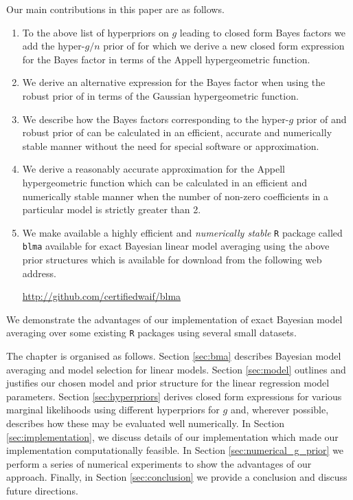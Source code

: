 Our main contributions in this paper are as follows.
\begin{enumerate}
	\item To the above list of hyperpriors on $g$ leading to closed form Bayes factors
	we add the  hyper-$g/n$ prior of \cite{Liang2008} for which we
	derive a new closed form expression for the Bayes factor in terms
	of the Appell hypergeometric function.
	
	\item We derive an alternative expression for the Bayes factor when using the
	robust prior of \cite{Bayarri2012} in terms of the Gaussian hypergeometric function.
	
	\item We describe how the  Bayes factors corresponding to the hyper-$g$ prior of \cite{Liang2008} 
	and robust prior of \cite{Bayarri2012} can be calculated in an efficient, accurate and numerically 
	stable manner without the need for special software or approximation.
	
	\item We derive a reasonably accurate approximation for the Appell hypergeometric function
	which can be calculated in an efficient and numerically 
	stable manner when the number of non-zero coefficients in a particular model is strictly greater than 2.
	
	\item We make available a highly efficient and {\it numerically stable} {\tt R}
	package called
	{\tt blma} available
	for exact Bayesian linear model averaging 
	using the above prior structures which is available for download from the following web address.
	
	\begin{center}
		\url{http://github.com/certifiedwaif/blma}
	\end{center}

\end{enumerate}

\noindent 
We demonstrate the advantages of our implementation of exact Bayesian model
averaging over some existing {\tt R}
packages using several small datasets.


The chapter is organised as follows. Section \ref{sec:bma} describes Bayesian model averaging and model
selection for linear models. Section \ref{sec:model} outlines and justifies our chosen model and prior structure for the linear regression model parameters. Section 
\ref{sec:hyperpriors} derives closed form expressions for various marginal likelihoods using 
different hyperpriors for $g$ and, wherever possible, describes how these may be evaluated well numerically.
In Section \ref{sec:implementation}, we discuss details of our implementation which made our implementation 
computationally feasible.
In Section \ref{sec:numerical_g_prior} we perform a series of numerical experiments to show the advantages of our approach. 
Finally, in Section \ref{sec:conclusion} we provide a conclusion and discuss future
directions.
















